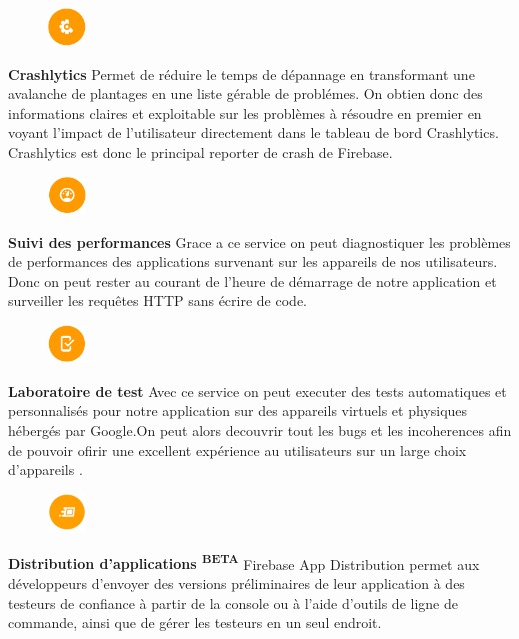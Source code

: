 \begin{figure}
    \includegraphics[width=1cm]{images/Chapitre2/Firebase_services/crashlytics.PNG}
    \end{figure}
\textbf{Crashlytics} Permet de réduire le temps de dépannage en transformant une avalanche
de plantages en une liste gérable de problémes. On obtien donc des informations claires et exploitable 
sur les problèmes à résoudre en premier en voyant l'impact de l'utilisateur directement dans le tableau
 de bord Crashlytics. Crashlytics est donc le principal reporter de crash de Firebase.\medskip

\begin{figure}
\includegraphics[width=1cm]{images/Chapitre2/Firebase_services/performance_monitoring.PNG}
    \end{figure}
\textbf{Suivi des performances} Grace a ce service on peut diagnostiquer les problèmes de performances 
des applications survenant sur les appareils de nos utilisateurs. Donc on peut rester au courant 
de l'heure de démarrage de notre application et surveiller les requêtes HTTP sans écrire de code.\medskip

\begin{figure}
    \includegraphics[width=1cm]{images/Chapitre2/Firebase_services/test_lab.PNG}
        \end{figure}
\textbf{Laboratoire de test} Avec ce service on peut executer des tests automatiques et personnalisés pour 
notre application sur des appareils virtuels et physiques hébergés par Google.On peut alors decouvrir 
tout les bugs et les incoherences afin de pouvoir ofirir une excellent expérience au utilisateurs 
sur un large choix d'appareils .\medskip
 
\begin{figure}
    \includegraphics[width=1cm]{images/Chapitre2/Firebase_services/App_distribution.jpg}
        \end{figure}
\textbf{Distribution d'applications \textsuperscript{BETA}} Firebase App Distribution permet aux développeurs
 d'envoyer des versions préliminaires de leur application à des testeurs de confiance à partir de la console 
 ou à l'aide d'outils de ligne de commande, ainsi que de gérer les testeurs en un seul endroit.\bigskip 

